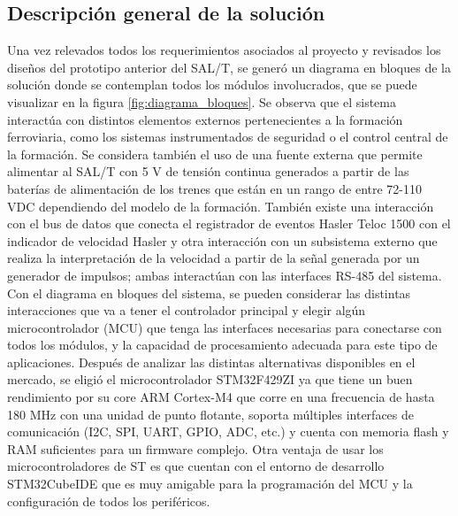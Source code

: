 \subsection{Descripción general de la solución}

Una vez relevados todos los requerimientos asociados al proyecto y revisados los diseños del prototipo anterior del SAL/T, se generó un diagrama en bloques de la solución donde se contemplan todos los módulos involucrados, que se puede visualizar en la figura \ref{fig:diagrama_bloques}. Se observa que el sistema interactúa con distintos elementos externos pertenecientes a la formación ferroviaria, como los sistemas instrumentados de seguridad o el control central de la formación. Se considera también el uso de una fuente externa que permite alimentar al SAL/T con 5 V de tensión continua generados a partir de las baterías de alimentación de los trenes que están en un rango de entre 72-110 VDC dependiendo del modelo de la formación. También existe una interacción con el bus de datos que conecta el registrador de eventos Hasler Teloc 1500 \cite{hasler} con el indicador de velocidad Hasler y otra interacción con un subsistema externo que realiza la interpretación de la velocidad a partir de la señal generada por un generador de impulsos; ambas interactúan con las interfaces RS-485 del sistema. \\


Con el diagrama en bloques del sistema, se pueden considerar las distintas interacciones que va a tener el controlador principal y elegir algún microcontrolador (MCU) que tenga las interfaces necesarias para conectarse con todos los módulos, y la capacidad de procesamiento adecuada para este tipo de aplicaciones. Después de analizar las distintas alternativas disponibles en el mercado, se eligió el microcontrolador STM32F429ZI ya que tiene un buen rendimiento por su core ARM Cortex-M4 que corre en una frecuencia de hasta 180 MHz con una unidad de punto flotante, soporta múltiples interfaces de comunicación (I2C, SPI, UART, GPIO, ADC, etc.) y cuenta con memoria flash y RAM suficientes para un firmware complejo. Otra ventaja de usar los microcontroladores de ST es que cuentan con el entorno de desarrollo STM32CubeIDE que es muy amigable para la programación del MCU y la configuración de todos los periféricos. \\ 


